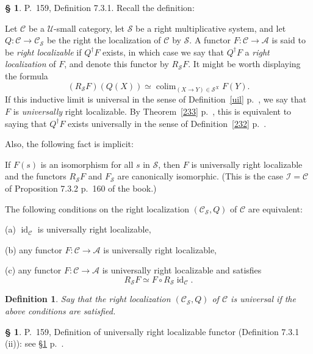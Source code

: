\documentclass[12pt]{article}%
\newtheorem{df}[thm]{Definition}%
\theoremstyle{remark}
\theoremstyle{definition}
\newtheorem{s}[thm]{\S}%
\newcommand{\nn}{\noindent}
\newcommand{\cc}{\mathcal}
\newcommand{\A}{\mathcal A}
\newcommand{\C}{\mathcal C}
\newcommand{\U}{\mathcal U}
\DeclareMathOperator*{\colim}{colim}%
\DeclareMathOperator{\id}{id}
\begin{document}
\begin{s}\label{durl} 
P.~159, Definition 7.3.1. Recall the definition: 

Let $\C$ be a $\U$-small category, let $\cc S$ be a right multiplicative system, and let $Q:\C\to\C_{\cc S}$ be the right the localization of $\C$ by $\cc S$. A functor $F:\C\to\A$ is said to be {\em right localizable} if $Q^\dagger F$ exists, in which case we say that $Q^\dagger F$ a {\em right localization} of $F$, and denote this functor by $R_{\cc S}F$. It might be worth displaying the formula 
$$
(R_{\cc S}F)(Q(X))\simeq\colim_{(X\to Y)\in\cc S^X}F(Y).
$$ 
If this inductive limit is universal in the sense of Definition~\ref{uil} p.~\pageref{uil}, we say that $F$ is {\em universally} right localizable.  By Theorem~\ref{233} p.~\pageref{233}, this is equivalent to saying that $Q^\dagger F$ exists universally in the sense of Definition~\ref{232} p.~\pageref{232}. 

Also, the following fact is implicit:

If $F(s)$ is an isomorphism for all $s$ in $\cc S$, then $F$ is universally right localizable and the functors $R_{\cc S}F$ and $F_{\cc S}$ are canonically isomorphic. (This is the case $\cc I=\C$ of Proposition 7.3.2 p.~160 of the book.)

The following conditions on the right localization $(\C_{\cc S},Q)$ of $\C$ are equivalent: 

\nn(a) $\id_\C$ is universally right localizable, 

\nn(b) any functor $F:\C\to\A$ is universally right localizable, 

\nn(c) any functor $F:\C\to\A$ is universally right localizable and satisfies 
$$
R_{\cc S}F\simeq F\circ R_{\cc S}\id_\C.
$$

\begin{df}\label{url2}
Say that the right localization $(\C_{\cc S},Q)$ of $\C$ is {\em universal} if the above conditions are satisfied.
\end{df}
\end{s}

%

\begin{s}
P.~159, Definition of universally right localizable functor (Definition 7.3.1 (ii)): see \S\ref{durl} p.~\pageref{durl}. 
\end{s}

%
\end{document}
